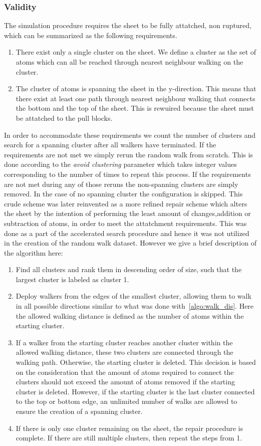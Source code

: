 \subsubsection{Validity}
The simulation procedure requires the sheet to be fully attatched, non ruptured, which can be summarized as the following requirements. 
\begin{enumerate}
  \item There exist only a single cluster on the sheet. We define a cluster as the set of atoms which can all be reached through nearest neighbour walking on the cluster.
  \item The cluster of atoms is spanning the sheet in the y-direction. This means that there exist at least one path through nearest neighbour walking that connects the bottom and the top of the sheet. This is rewuired because the sheet must be attatched to the pull blocks.
\end{enumerate}
In order to accommodate these requirements we count the number of clusters and search for a spanning cluster after all walkers have terminated. If the requirements are not met we simply rerun the random walk from scratch. This is done according to the \textit{avoid clustering} parameter which takes integer values corresponding to the number of times to repeat this process. If the requirements are not met during any of those reruns the non-spanning clusters are simply removed. In the case of no spanning cluster the configuration is skipped. This crude scheme was later reinvented as a more refined repair scheme which alters the sheet by the intention of performing the least amount of changes,addition or subtraction of atoms, in order to meet the attatchment requirements. This was done as a part of the accelerated search procedure and hence it was not utilized in the creation of the random walk dataset. However we give a brief description of the algorithm here:
\begin{enumerate}
  \item Find all clusters and rank them in descending order of size, such that the largest cluster is labeled as cluster 1.
  \item Deploy walkers from the edges of the smallest cluster, allowing them to walk in all possible directions similar to what was done with~\cref{algo:walk_dis}. Here the allowed walking distance is defined as the number of atoms within the starting cluster.
  \item If a walker from the starting cluster reaches another cluster within the allowed walking distance, these two clusters are connected through the walking path. Otherwise, the starting cluster is deleted. This decision is based on the consideration that the amount of atoms required to connect the clusters should not exceed the amount of atoms removed if the starting cluster is deleted. However, if the starting cluster is the last cluster connected to the top or bottom edge, an unlimited number of walks are allowed to ensure the creation of a spanning cluster.
  \item If there is only one cluster remaining on the sheet, the repair procedure is complete. If there are still multiple clusters, then repeat the steps from 1.
\end{enumerate}  
